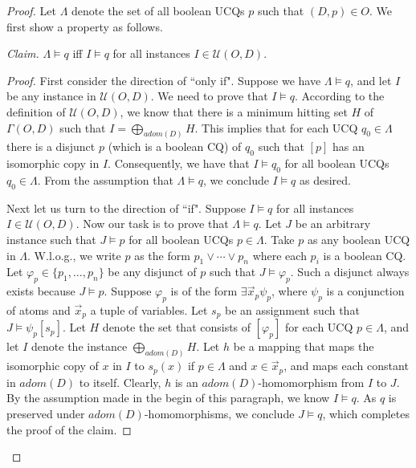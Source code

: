 \documentclass[letterpaper]{article} %
\theoremstyle{definition}
\theoremstyle{remark}
\theoremstyle{definition}
\begin{document}
\begin{proof}
Let $\Lambda$ denote the set of all boolean UCQs $p$ such that $(D,p)\in O$. We first show a property as follows.

\medskip
{\noindent\em Claim.} $\Lambda\vDash q$ iff $I\models q$ for all instances $I\in\mathcal{U}(O,D)$.%

\begin{proof}
First consider the direction of ``only if". Suppose we have $\Lambda\vDash q$, and let $I$ be any instance in $\mathcal{U}(O,D)$. We need to prove that $I\models q$. According to the definition of $\mathcal{U}(O,D)$, we know that there is a minimum hitting set $H$ of $\Gamma(O,D)$ such that $I=\bigoplus_{\textit{adom}(D)}H$. This implies that for each UCQ $q_0\in\Lambda$ there is a disjunct $p$ (which is a boolean CQ) of $q_0$ such that $[p]$ has an isomorphic copy in $I$. Consequently, we have that $I\models q_0$ for all boolean UCQs $q_0\in\Lambda$. From the assumption that $\Lambda\vDash q$, we conclude $I\models q$ as desired.

Next let us turn to the direction of ``if". Suppose $I\models q$ for all instances $I\in\mathcal{U}(O,D)$. Now our task is to prove that $\Lambda\vDash q$. Let $J$ be an arbitrary instance such that $J\models p$ for all boolean UCQs $p\in\Lambda$. Take $p$ as any boolean UCQ in $\Lambda$. W.l.o.g., we write $p$ as the form $p_1\vee\cdots\vee p_n$ where each $p_i$ is a boolean CQ. Let $\varphi_p\in\{p_1,\dots,p_n\}$ be any disjunct of $p$ such that $J\models\varphi_p$. Such a disjunct always exists because $J\models p$. Suppose $\varphi_p$ is of the form $\exists\vec{x}_p\psi_p$, where $\psi_p$ is a conjunction of atoms and $\vec{x}_p$ a tuple of variables. Let $s_p$ be an assignment such that $J\models\psi_p[s_p]$. Let $H$ denote the set that consists of $[\varphi_p]$ for each UCQ $p\in\Lambda$, and let $I$ denote the instance $\bigoplus_{\textit{adom}(D)}H$. Let $h$ be a mapping that maps the isomorphic copy of $x$ in $I$ to $s_p(x)$ if $p\in\Lambda$ and $x\in\vec{x}_p$, and maps each constant in $\textit{adom}(D)$ to itself. Clearly, $h$ is an $\textit{adom}(D)$-homomorphism from $I$ to $J$. By the assumption made in the begin of this paragraph, we know $I\models q$. As $q$ is preserved under $\textit{adom}(D)$-homomorphisms, we conclude $J\models q$, which completes the proof of the claim.
\end{proof}


\end{proof}
\end{document}
